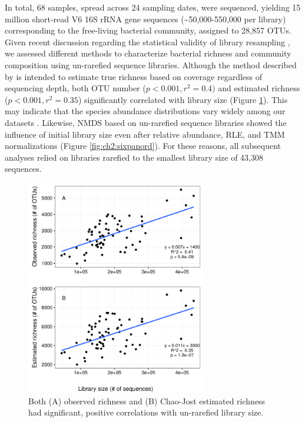 In total, 68 samples, spread across 24 sampling dates, were sequenced, yielding 15 million short-read V6 16S rRNA gene sequences (\textasciitilde{}50,000-550,000 per library) corresponding to the free-living bacterial community, assigned to 28,857 OTUs. Given recent discussion regarding the statistical validity of library resampling \citep{McMurdie2014-iu}, we assessed different methods to characterize bacterial richness and community composition using un-rarefied sequence libraries. Although the method described by \citet{chao2014rarefaction} is intended to estimate true richness based on coverage regardless of sequencing depth, both OTU number ($p < 0.001, r^2 = 0.4)$ and estimated richness ($p <0.001, r^{2} = 0.35$) significantly correlated with library size (Figure \ref{fig:ch2:unrarrich}). This may indicate that the species abundance distributions vary widely among our datasets \citep{gwinn2015evaluating}. Likewise, NMDS based on un-rarefied sequence libraries showed the influence of initial library size even after relative abundance, RLE, and TMM normalizations (Figure \ref{fig:ch2:sixpanord}). For these reasons, all subsequent analyses relied on libraries rarefied to the smallest library size of 43,308 sequences.


\begin{figure}[ht!] 
\centering 
\includegraphics[width=0.7\textwidth]{Chapter_3_SWI/Figures/Supplemental_Figure_5_unrarefied_estimated_richness} 
\caption[Observed and estimated (Chao-Jost) richness versus un-rarefied library size.]{Both (A) observed richness and (B) Chao-Jost estimated richness had significant, positive correlations with un-rarefied library size.} 
\label{fig:ch2:unrarrich} 
\end{figure}

